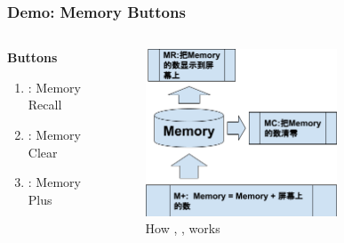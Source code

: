 \documentclass[
	11pt, %
]{beamer}
\begin{document}
\begin{frame}
	\frametitle{Demo: Memory Buttons}
	\begin{columns}[t]
			\begin{column}{0.2\textwidth}
				\textbf{Buttons}
				\begin{enumerate}
				\item {}: Memory Recall
				\item {}: Memory Clear
				\item {}: Memory Plus
			\end{enumerate}
			\end{column}

			\begin{column}{0.8\textwidth}
			   \begin{figure}
				    \includegraphics[width=0.7\textwidth]{Memory_Buttons_How.png}
				    \caption{How , ,  works}
			    \end{figure}
			\end{column}
		\end{columns}
\end{frame}

\end{document}
